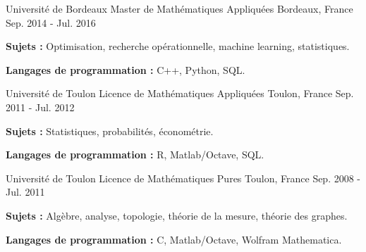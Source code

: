 

\begin{cventries}

  \cventry
    {Université de Bordeaux} %
    {Master de Mathématiques Appliquées} %
    {Bordeaux, France} %
    {Sep. 2014 - Jul. 2016} %
    {
    \begin{cvitems} %
        \item {\textbf{Sujets :} Optimisation, recherche opérationnelle, machine learning, statistiques.}
        \item {\textbf{Langages de programmation :} C++, Python, SQL.}
    \end{cvitems}
    }


\cventry
    {Université de Toulon} %
    {Licence de Mathématiques Appliquées} %
    {Toulon, France} %
    {Sep. 2011 - Jul. 2012} %
    {
    \begin{cvitems} %
        \item {\textbf{Sujets :} Statistiques, probabilités, économétrie.}
        \item {\textbf{Langages de programmation :} R, Matlab/Octave, SQL.}
    \end{cvitems}
    }


\cventry
    {Université de Toulon} %
    {Licence de Mathématiques Pures} %
    {Toulon, France} %
    {Sep. 2008 - Jul. 2011} %
    {
    \begin{cvitems} %
        \item {\textbf{Sujets :} Algèbre, analyse, topologie, théorie de la mesure, théorie des graphes.}
        \item {\textbf{Langages de programmation :} C, Matlab/Octave, Wolfram Mathematica.}
    \end{cvitems}
    }



\end{cventries}
